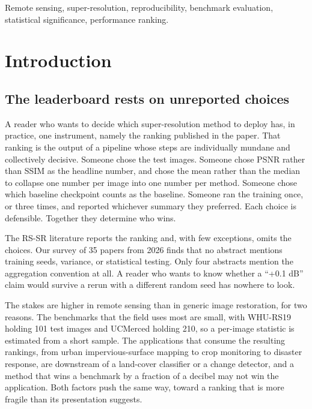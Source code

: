 \documentclass[journal,twoside,10pt]{IEEEtran}
\begin{document}
\begin{IEEEkeywords}
Remote sensing, super-resolution, reproducibility, benchmark evaluation, statistical significance, performance ranking.
\end{IEEEkeywords}


\section{Introduction}


\subsection{The leaderboard rests on unreported choices}


A reader who wants to decide which super-resolution method to deploy has, in practice, one instrument, namely the ranking published in the paper. That ranking is the output of a pipeline whose steps are individually mundane and collectively decisive. Someone chose the test images. Someone chose PSNR rather than SSIM as the headline number, and chose the mean rather than the median to collapse one number per image into one number per method. Someone chose which baseline checkpoint counts as the baseline. Someone ran the training once, or three times, and reported whichever summary they preferred. Each choice is defensible. Together they determine who wins.

The RS-SR literature reports the ranking and, with few exceptions, omits the choices. Our survey of 35 papers from 2026 finds that no abstract mentions training seeds, variance, or statistical testing. Only four abstracts mention the aggregation convention at all. A reader who wants to know whether a ``+0.1 dB'' claim would survive a rerun with a different random seed has nowhere to look.

The stakes are higher in remote sensing than in generic image restoration, for two reasons. The benchmarks that the field uses most are small, with WHU-RS19 holding 101 test images and UCMerced holding 210, so a per-image statistic is estimated from a short sample. The applications that consume the resulting rankings, from urban impervious-surface mapping to crop monitoring to disaster response, are downstream of a land-cover classifier or a change detector, and a method that wins a benchmark by a fraction of a decibel may not win the application. Both factors push the same way, toward a ranking that is more fragile than its presentation suggests.
\end{document}
